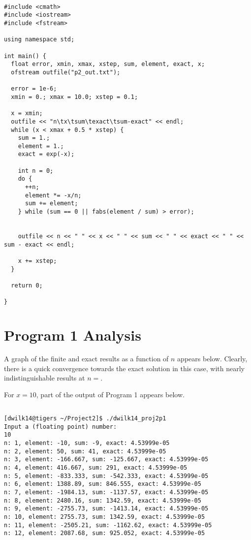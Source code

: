 \documentclass[11pt]{article}
\begin{document}
\begin{verbatim}

#include <cmath>
#include <iostream>
#include <fstream>

using namespace std;

int main() {
  float error, xmin, xmax, xstep, sum, element, exact, x;
  ofstream outfile("p2_out.txt");

  error = 1e-6;
  xmin = 0.; xmax = 10.0; xstep = 0.1;

  x = xmin;
  outfile << "n\tx\tsum\texact\tsum-exact" << endl; 
  while (x < xmax + 0.5 * xstep) {
    sum = 1.;
    element = 1.;
    exact = exp(-x);

    int n = 0;
    do {
      ++n;
      element *= -x/n;
      sum += element;
    } while (sum == 0 || fabs(element / sum) > error);


    outfile << n << " " << x << " " << sum << " " << exact << " " << sum - exact << endl;

    x += xstep;
  }

  return 0;

}

\end{verbatim}

\section{Program 1 Analysis}
\label{sec:orgdb0e617}

A graph of the finite and exact results as a function of \(n\) appears below.
Clearly, there is a quick convergence towards the exact solution in this case, with nearly indistinguishable results at \(n=\).

For \(x=10\), part of the output of Program 1 appears below.

\begin{verbatim}

[dwilk14@tigers ~/Project2]$ ./dwilk14_proj2p1
Input a (floating point) number:
10
n: 1, element: -10, sum: -9, exact: 4.53999e-05
n: 2, element: 50, sum: 41, exact: 4.53999e-05
n: 3, element: -166.667, sum: -125.667, exact: 4.53999e-05
n: 4, element: 416.667, sum: 291, exact: 4.53999e-05
n: 5, element: -833.333, sum: -542.333, exact: 4.53999e-05
n: 6, element: 1388.89, sum: 846.555, exact: 4.53999e-05
n: 7, element: -1984.13, sum: -1137.57, exact: 4.53999e-05
n: 8, element: 2480.16, sum: 1342.59, exact: 4.53999e-05
n: 9, element: -2755.73, sum: -1413.14, exact: 4.53999e-05
n: 10, element: 2755.73, sum: 1342.59, exact: 4.53999e-05
n: 11, element: -2505.21, sum: -1162.62, exact: 4.53999e-05
n: 12, element: 2087.68, sum: 925.052, exact: 4.53999e-05

\end{verbatim}
\end{document}
